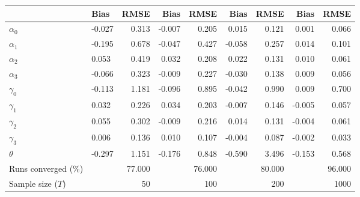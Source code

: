 
\begin{tabular}[t]{llrrrrrrr}
\toprule
  & Bias & RMSE & Bias & RMSE & Bias & RMSE & Bias & RMSE\\
\midrule
$\alpha_{0}$ & -0.027 & 0.313 & -0.007 & 0.205 & 0.015 & 0.121 & 0.001 & 0.066\\
$\alpha_{1}$ & -0.195 & 0.678 & -0.047 & 0.427 & -0.058 & 0.257 & 0.014 & 0.101\\
$\alpha_{2}$ & 0.053 & 0.419 & 0.032 & 0.208 & 0.022 & 0.131 & 0.010 & 0.061\\
$\alpha_{3}$ & -0.066 & 0.323 & -0.009 & 0.227 & -0.030 & 0.138 & 0.009 & 0.056\\
$\gamma_{0}$ & -0.113 & 1.181 & -0.096 & 0.895 & -0.042 & 0.990 & 0.009 & 0.700\\
$\gamma_{1}$ & 0.032 & 0.226 & 0.034 & 0.203 & -0.007 & 0.146 & -0.005 & 0.057\\
$\gamma_{2}$ & 0.055 & 0.302 & -0.009 & 0.216 & 0.014 & 0.131 & -0.004 & 0.061\\
$\gamma_{3}$ & 0.006 & 0.136 & 0.010 & 0.107 & -0.004 & 0.087 & -0.002 & 0.033\\
$\theta$ & -0.297 & 1.151 & -0.176 & 0.848 & -0.590 & 3.496 & -0.153 & 0.568\\
Runs converged (\%) &  & 77.000 &  & 76.000 &  & 80.000 &  & 96.000\\
Sample size ($T$) &  & 50 &  & 100 &  & 200 &  & 1000\\
\bottomrule
\end{tabular}

